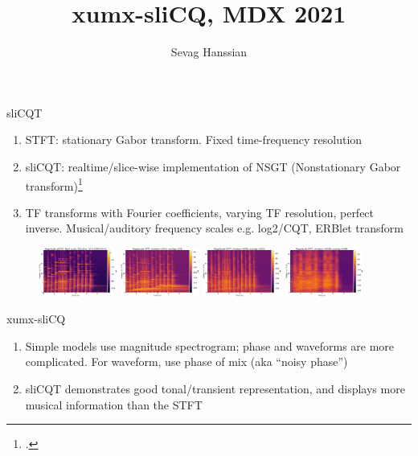 \documentclass[final]{beamer}
\title{xumx-sliCQ, MDX 2021}
\author{Sevag Hanssian}
\institute{McGill University}
\begin{document}
  \begin{frame}{} 
    \begin{block}{sliCQT}
	  \begin{enumerate}
		  \item
			  STFT: stationary Gabor transform. Fixed time-frequency resolution
		  \item
			  sliCQT: realtime/slice-wise implementation of NSGT (Nonstationary Gabor transform)\footcite{slicq, balazs}
		  \item
			  TF transforms with Fourier coefficients, varying TF resolution, perfect inverse. Musical/auditory frequency scales e.g. log2/CQT, ERBlet transform
	  \end{enumerate}
    \end{block}
	  \begin{figure}
		  \centering
		  \includegraphics[width=0.23\textwidth]{./images-poster/slicq.png}
		  \includegraphics[width=0.23\textwidth]{./images-poster/stft_small.png}
		  \includegraphics[width=0.23\textwidth]{./images-poster/stft.png}
		  \includegraphics[width=0.23\textwidth]{./images-poster/stft_big.png}
	  \end{figure}
	\begin{block}{xumx-sliCQ}
	  \begin{enumerate}
		  \item
			  Simple models use magnitude spectrogram; phase and waveforms are more complicated. For waveform, use phase of mix (aka ``noisy phase'')
		  \item
			  sliCQT demonstrates good tonal/transient representation, and displays more musical information than the STFT

\end{enumerate}
\end{block}
\end{frame}
\end{document}
